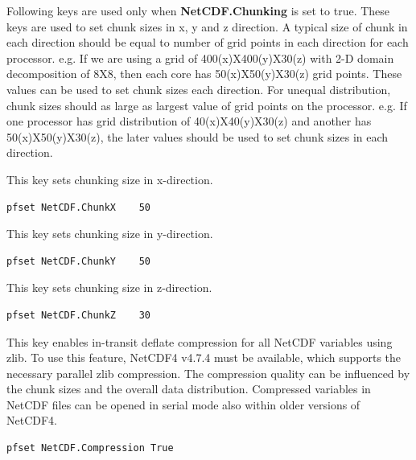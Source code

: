 Following keys are used only when \textbf{NetCDF.Chunking} is set to true. These keys are used to set chunk sizes in x, y and z direction. A typical size of chunk in each direction should be equal to number of grid points in each direction for each processor. e.g. If we are using a grid of 400(x)X400(y)X30(z) with 2-D domain decomposition of 8X8, then each core has 50(x)X50(y)X30(z) grid points. These values can be used to set chunk sizes each direction. For unequal distribution, chunk sizes should as large as largest value of grid points on the processor. e.g. If one processor has grid distribution of 40(x)X40(y)X30(z) and another has 50(x)X50(y)X30(z), the later values should be used to set chunk sizes in each direction.

{This key sets chunking size in x-direction.}
\begin{display}\begin{verbatim}
pfset NetCDF.ChunkX    50
\end{verbatim}\end{display}

{This key sets chunking size in y-direction.}
\begin{display}\begin{verbatim}
pfset NetCDF.ChunkY    50
\end{verbatim}\end{display}

{This key sets chunking size in z-direction.}
\begin{display}\begin{verbatim}
pfset NetCDF.ChunkZ    30
\end{verbatim}\end{display}

{This key enables in-transit deflate compression for all NetCDF variables using zlib. To use this feature, NetCDF4 v4.7.4 must be available, which supports the necessary parallel zlib compression. The compression quality can be influenced by the chunk sizes and the overall data distribution. Compressed variables in NetCDF files can be opened in serial mode also within older versions of NetCDF4.}
\begin{display}\begin{verbatim}
pfset NetCDF.Compression True
\end{verbatim}\end{display}

